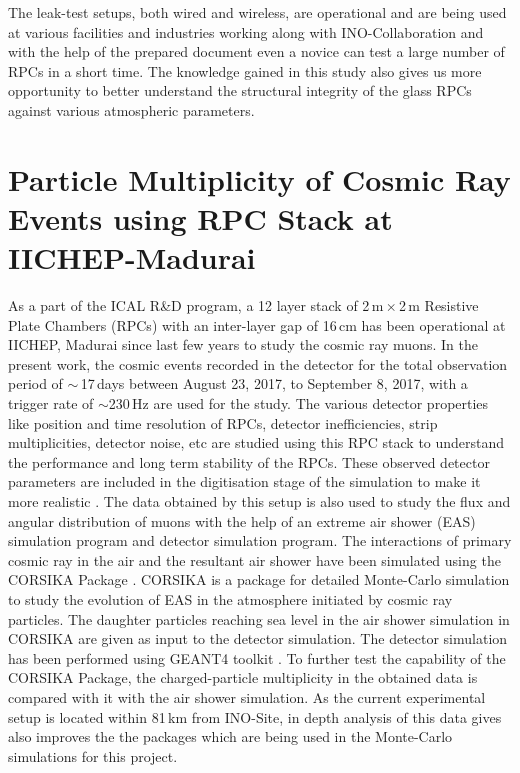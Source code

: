The leak-test setups, both wired and wireless, are operational and are
being used at various facilities and industries working along with
INO-Collaboration and with the help of the prepared document even a
novice can test a large number of RPCs in a short time. The knowledge
gained in this study also gives us more opportunity to better
understand the structural integrity of the glass RPCs against various
atmospheric parameters.

\section*{Particle Multiplicity of Cosmic Ray Events using RPC Stack at IICHEP-Madurai}

As a part of the ICAL R\&D program, a 12 layer stack of
2\,m\,$\times$\,2\,m Resistive Plate Chambers (RPCs) with an
inter-layer gap of 16\,cm has been operational at IICHEP, Madurai
since last few years to study the cosmic ray muons. In the present
work, the cosmic events recorded in the detector for the total
observation period of $\sim$\,17\,days between August 23, 2017, to
September 8, 2017, with a trigger rate of $\sim$230\,Hz are used for
the study. The various detector properties like position and time
resolution of RPCs, detector inefficiencies, strip multiplicities,
detector noise, etc are studied using this RPC stack to understand the
performance and long term stability of the RPCs. These observed
detector parameters are included in the digitisation stage of the
simulation to make it more realistic \cite{pethu1}. The data obtained
by this setup is also used to study the flux and angular distribution
of muons with the help of an extreme air shower (EAS) simulation
program and detector simulation program. The interactions of primary
cosmic ray in the air and the resultant air shower have been simulated
using the CORSIKA Package \cite{corsika763}. CORSIKA is a package for
detailed Monte-Carlo simulation to study the evolution of EAS in the
atmosphere initiated by cosmic ray particles. The daughter particles
reaching sea level in the air shower simulation in CORSIKA are given
as input to the detector simulation. The detector simulation has been
performed using GEANT4 toolkit \cite{geant4}. To further test the
capability of the CORSIKA Package, the charged-particle multiplicity
in the obtained data is compared with it with the air shower
simulation. As the current experimental setup is located within 81\,km
from INO-Site, in depth analysis of this data gives also improves the
the packages which are being used in the Monte-Carlo simulations for
this project.

